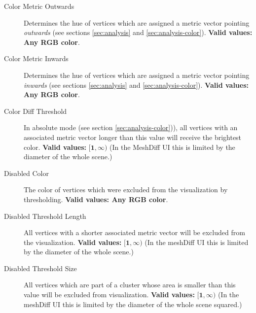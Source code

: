 \begin{description}
\item [Color Metric Outwards] Determines the hue of vertices which are assigned a metric vector pointing {\it outwards} (see sections \ref{sec:analysis} and \ref{sec:analysis-color}). {\bf Valid values: Any RGB color}.

\item [Color Metric Inwards] Determines the hue of vertices which are assigned a metric vector pointing {\it inwards} (see sections \ref{sec:analysis} and \ref{sec:analysis-color}). {\bf Valid values: Any RGB color}.

\item [Color Diff Threshold] In absolute mode (see section \ref{sec:analysis-color})), all vertices with an associated metric vector longer than this value will receive the brightest color. {\bf Valid values:} \(\bm{[1, \infty)}\) (In the MeshDiff UI this is limited by the diameter of the whole scene.)

\item [Disabled Color] The color of vertices which were excluded from the visualization by thresholding. {\bf Valid values: Any RGB color}.

\item [Disabled Threshold Length] All vertices with a shorter associated metric vector will be excluded from the visualization. {\bf Valid values:} \(\bm{[1, \infty)}\) (In the meshDiff UI this is limited by the diameter of the whole scene.)

\item [Disabled Threshold Size] All vertices which are part of a cluster whose area is smaller than this value will be excluded from visualization. {\bf Valid values:} \(\bm{[1, \infty)}\) (In the meshDiff UI this is limited by the diameter of the whole scene squared.)
\end{description}